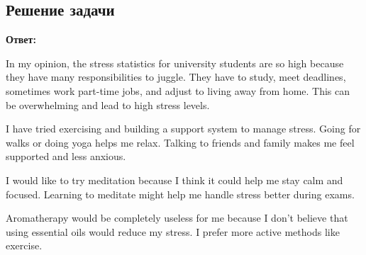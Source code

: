 \documentclass[a4paper,12pt]{article}
\begin{document}
\subsection{Решение задачи}

\textbf{Ответ:}

In my opinion, the stress statistics for university students are so high because they have many responsibilities to juggle. They have to study, meet deadlines, sometimes work part-time jobs, and adjust to living away from home. This can be overwhelming and lead to high stress levels.

I have tried exercising and building a support system to manage stress. Going for walks or doing yoga helps me relax. Talking to friends and family makes me feel supported and less anxious.

I would like to try meditation because I think it could help me stay calm and focused. Learning to meditate might help me handle stress better during exams.

Aromatherapy would be completely useless for me because I don't believe that using essential oils would reduce my stress. I prefer more active methods like exercise.
\end{document}
